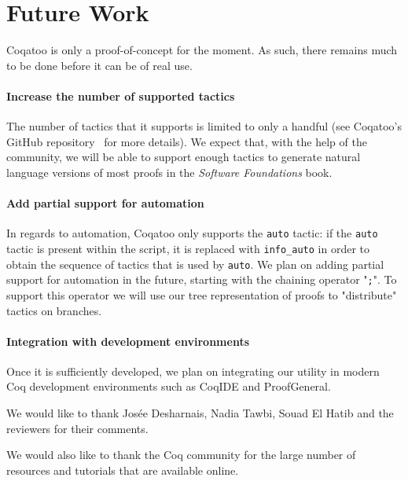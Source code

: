 \documentclass[sigplan,9pt]{acmart}\settopmatter{printfolios=true,printccs=false,printacmref=false}
\begin{document}
\pagebreak
\section{Future Work}
Coqatoo is only a proof-of-concept for the moment. As such, there remains much to be done before it can be of real use. 

\paragraph{Increase the number of supported tactics}
The number of tactics that it supports is limited to only a handful (see Coqatoo's GitHub repository~\cite{Coqatoo} for more details). We expect that, with the help of the community, we will be able to support enough tactics to generate natural language versions of most proofs in the \emph{Software Foundations} book.

\paragraph{Add partial support for automation}
In regards to automation, Coqatoo only supports the \lstinline{auto} tactic: if the \lstinline{auto} tactic is present within the script, it is replaced with \lstinline{info_auto} in order to obtain the sequence of tactics that is used by \lstinline{auto}. We plan on adding partial support for automation in the future, starting with the chaining operator "\lstinline{;}". To support this operator we will use our tree representation of proofs to "distribute" tactics on branches.

\paragraph{Integration with development environments} Once it is sufficiently developed, we plan on integrating our utility in modern Coq development environments such as CoqIDE and ProofGeneral.

\newpage

\begin{acks}
  We would like to thank Josée Desharnais, Nadia Tawbi, Souad El Hatib and the reviewers for their comments.

  We would also like to thank the Coq community for the large number of resources and tutorials that are available online.
\end{acks}


\end{document}
